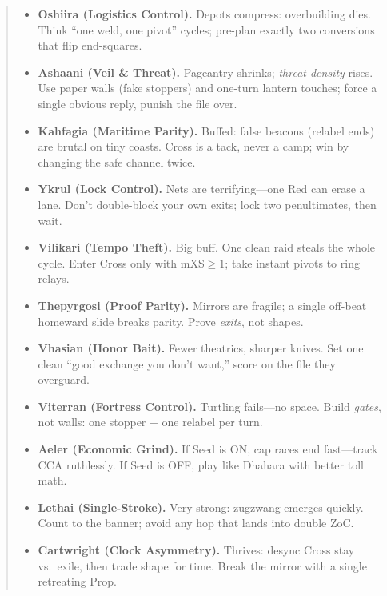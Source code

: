 \documentclass[11pt]{article}
\begin{document}
\begin{quote}
\begin{tcolorbox}[enhanced,breakable,title={4$\times$4 Pocket Diamond — What Changes},
  colback=white,colframe=royal,boxrule=0.8pt]
\begin{itemize}[leftmargin=1.1em,itemsep=0.3em]
\item \textbf{Oshiira (Logistics Control).} Depots compress: overbuilding dies. Think “one weld, one pivot” cycles; pre-plan exactly two conversions that flip end-squares.

\item \textbf{Ashaani (Veil \& Threat).} Pageantry shrinks; \emph{threat density} rises. Use paper walls (fake stoppers) and one-turn lantern touches; force a single obvious reply, punish the file over.

\item \textbf{Kahfagia (Maritime Parity).} Buffed: false beacons (relabel ends) are brutal on tiny coasts. Cross is a tack, never a camp; win by changing the safe channel twice.

\item \textbf{Ykrul (Lock Control).} Nets are terrifying—one Red can erase a lane. Don’t double-block your own exits; lock two penultimates, then wait.

\item \textbf{Vilikari (Tempo Theft).} Big buff. One clean raid steals the whole cycle. Enter Cross only with mXS$\ge1$; take instant pivots to ring relays.

\item \textbf{Thepyrgosi (Proof Parity).} Mirrors are fragile; a single off-beat homeward slide breaks parity. Prove \emph{exits}, not shapes.

\item \textbf{Vhasian (Honor Bait).} Fewer theatrics, sharper knives. Set one clean “good exchange you don’t want,” score on the file they overguard.

\item \textbf{Viterran (Fortress Control).} Turtling fails—no space. Build \emph{gates}, not walls: one stopper + one relabel per turn.

\item \textbf{Aeler (Economic Grind).} If Seed is ON, cap races end fast—track CCA ruthlessly. If Seed is OFF, play like Dhahara with better toll math.

\item \textbf{Lethai (Single-Stroke).} Very strong: zugzwang emerges quickly. Count to the banner; avoid any hop that lands into double ZoC.

\item \textbf{Cartwright (Clock Asymmetry).} Thrives: desync Cross stay vs.\ exile, then trade shape for time. Break the mirror with a single retreating Prop.
\end{itemize}
\end{tcolorbox}


\end{quote}
\end{document}
